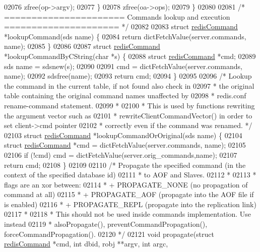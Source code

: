 \begin{DoxyCode}
{{{{{{{{{{{{{{{{{{{{{{{{{{{{{02076         zfree(op->argv);
02077     \}
02078     zfree(oa->ops);
02079 \}
02080 
02081 \textcolor{comment}{/* ====================== Commands lookup and execution ===================== */}
02082 
02083 \textcolor{keyword}{struct} \hyperlink{structredisCommand}{redisCommand} *lookupCommand(sds name) \{
02084     \textcolor{keywordflow}{return} dictFetchValue(server.commands, name);
02085 \}
02086 
02087 \textcolor{keyword}{struct} \hyperlink{structredisCommand}{redisCommand} *lookupCommandByCString(\textcolor{keywordtype}{char} *s) \{
02088     \textcolor{keyword}{struct} \hyperlink{structredisCommand}{redisCommand} *cmd;
02089     sds name = sdsnew(s);
02090 
02091     cmd = dictFetchValue(server.commands, name);
02092     sdsfree(name);
02093     \textcolor{keywordflow}{return} cmd;
02094 \}
02095 
02096 \textcolor{comment}{/* Lookup the command in the current table, if not found also check in}
02097 \textcolor{comment}{ * the original table containing the original command names unaffected by}
02098 \textcolor{comment}{ * redis.conf rename-command statement.}
02099 \textcolor{comment}{ *}
02100 \textcolor{comment}{ * This is used by functions rewriting the argument vector such as}
02101 \textcolor{comment}{ * rewriteClientCommandVector() in order to set client->cmd pointer}
02102 \textcolor{comment}{ * correctly even if the command was renamed. */}
02103 \textcolor{keyword}{struct} \hyperlink{structredisCommand}{redisCommand} *lookupCommandOrOriginal(sds name) \{
02104     \textcolor{keyword}{struct} \hyperlink{structredisCommand}{redisCommand} *cmd = dictFetchValue(server.commands, name);
02105 
02106     \textcolor{keywordflow}{if} (!cmd) cmd = dictFetchValue(server.orig\_commands,name);
02107     \textcolor{keywordflow}{return} cmd;
02108 \}
02109 
02110 \textcolor{comment}{/* Propagate the specified command (in the context of the specified database id)}
02111 \textcolor{comment}{ * to AOF and Slaves.}
02112 \textcolor{comment}{ *}
02113 \textcolor{comment}{ * flags are an xor between:}
02114 \textcolor{comment}{ * + PROPAGATE\_NONE (no propagation of command at all)}
02115 \textcolor{comment}{ * + PROPAGATE\_AOF (propagate into the AOF file if is enabled)}
02116 \textcolor{comment}{ * + PROPAGATE\_REPL (propagate into the replication link)}
02117 \textcolor{comment}{ *}
02118 \textcolor{comment}{ * This should not be used inside commands implementation. Use instead}
02119 \textcolor{comment}{ * alsoPropagate(), preventCommandPropagation(), forceCommandPropagation().}
02120 \textcolor{comment}{ */}
02121 \textcolor{keywordtype}{void} propagate(\textcolor{keyword}{struct} \hyperlink{structredisCommand}{redisCommand} *cmd, \textcolor{keywordtype}{int} dbid, robj **argv, \textcolor{keywordtype}{int} argc,
}}}}}}}}}}}}}}}}}}}}}}}}}}}}}
\end{DoxyCode}
